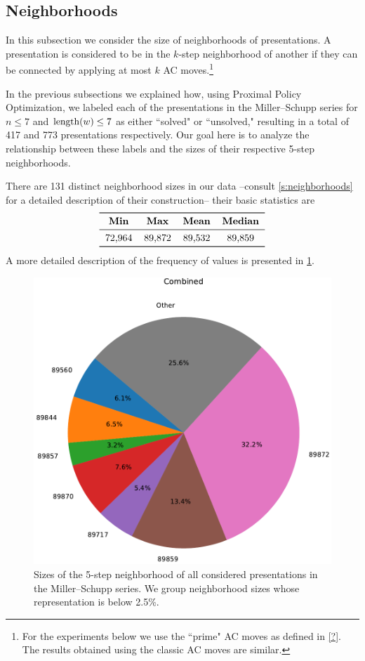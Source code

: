 
\subsection{Neighborhoods}

In this subsection we consider the size of neighborhoods of presentations.
A presentation is considered to be in the $k$-step neighborhood of another if they can be connected by applying at most $k$ AC moves.\footnote{For the experiments below we use the ``prime" AC moves as defined in \cref{?}. The results obtained using the classic AC moves are similar.}

In the previous subsections we explained how, using Proximal Policy Optimization, we labeled each of the presentations in the Miller–Schupp series for $n \leq 7$ and $\operatorname{length}(w) \leq 7$ as either ``solved" or ``unsolved," resulting in a total of 417 and 773 presentations respectively.
Our goal here is to analyze the relationship between these labels and the sizes of their respective 5-step neighborhoods.

There are 131 distinct neighborhood sizes in our data --consult \cref{s:neighborhoods} for a detailed description of their construction-- their basic statistics are
\[
\begin{tabular}{cccccc}
	\toprule
	\textbf{Min} & \textbf{Max} & \textbf{Mean} & \textbf{Median} \\
	\midrule
	72,964 & 89,872 & 89,532 & 89,859 \\
	\bottomrule
\end{tabular}
\]
A more detailed description of the frequency of values is presented in \cref{fig:prime_combined_pie}.

\begin{figure}
	\includegraphics[scale=.4]{fig/prime_combined_pie_rl_cropped.pdf}
	\caption{Sizes of the 5-step neighborhood of all considered presentations in the Miller–Schupp series. We group neighborhood sizes whose representation is below 2.5\%.}
	\label{fig:prime_combined_pie}
\end{figure}

